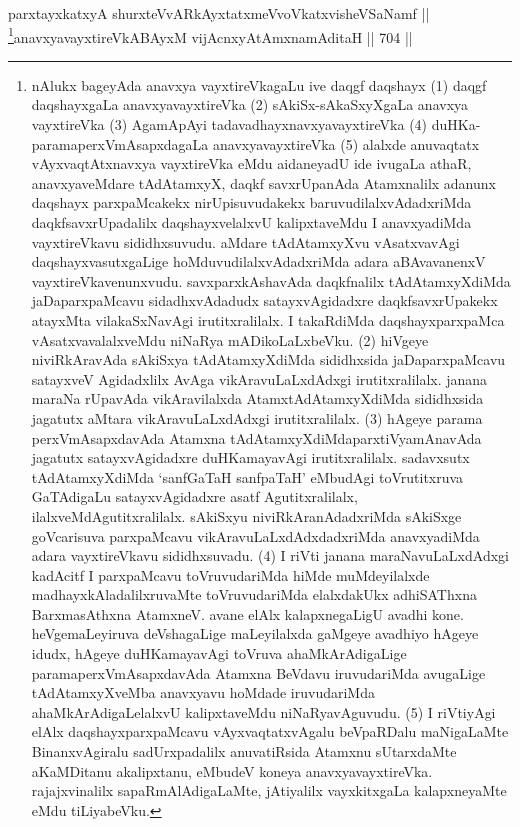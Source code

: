\begin{shl}
parxtayxkatxyA shurxteVvARkAyxtatxmeVvoVkatxvisheVSaNamf ||  \\
\footnote{nAlukx bageyAda anavxya vayxtireVkagaLu ive \ndash  daqgf daqshayx (1) daqgf daqshayxgaLa anavxyavayxtireVka (2)  sAkiSx-sAkaSxyXgaLa anavxya vayxtireVka (3) AgamApAyi tadavadhayxnavxyavayxtireVka (4) duHKa-paramaperxVmAsapxdagaLa anavxyavayxtireVka (5) alalxde anuvaqtatx vAyxvaqtAtxnavxya vayxtireVka eMdu aidaneyadU ide \ndash ivugaLa athaR, anavxyaveMdare tAdAtamxyX, daqkf savxrUpanAda Atamxnalilx adanunx daqshayx parxpaMcakekx nirUpisuvudakekx baruvudilalxvAdadxriMda daqkfsavxrUpadalilx daqshayxvelalxvU kalipxtaveMdu I anavxyadiMda vayxtireVkavu sididhxsuvudu. aMdare tAdAtamxyXvu vAsatxvavAgi daqshayxvasutxgaLige hoMduvudilalxvAdadxriMda adara aBAvavanenxV vayxtireVkavenunxvudu. savxparxkAshavAda daqkfnalilx tAdAtamxyXdiMda jaDaparxpaMcavu sidadhxvAdadudx satayxvAgidadxre daqkfsavxrUpakekx atayxMta vilakaSxNavAgi irutitxralilalx. I takaRdiMda daqshayxparxpaMca vAsatxvavalalxveMdu niNaRya mADikoLaLxbeVku. (2) hiVgeye niviRkAravAda sAkiSxya tAdAtamxyXdiMda sididhxsida jaDaparxpaMcavu satayxveV Agidadxlilx AvAga vikAravuLaLxdAdxgi irutitxralilalx. janana maraNa rUpavAda vikAravilalxda AtamxtAdAtamxyXdiMda sididhxsida jagatutx aMtara vikAravuLaLxdAdxgi irutitxralilalx. (3) hAgeye parama perxVmAsapxdavAda Atamxna tAdAtamxyXdiMda\break parxtiVyamAnavAda jagatutx satayxvAgidadxre duHKamayavAgi irutitxralilalx. sadavxsutx tAdAtamxyXdiMda `sanfGaTaH sanfpaTaH' eMbudAgi toVrutitxruva GaTAdigaLu satayxvAgidadxre asatf Agutitxralilalx, ilalxveMdAgutitxralilalx. sAkiSxyu niviRkAranAdadxriMda sAkiSxge goVcarisuva parxpaMcavu vikAravuLaLxdAdxdadxriMda anavxyadiMda adara vayxtireVkavu sididhxsuvadu. (4) I riVti janana maraNavuLaLxdAdxgi kadAcitf I parxpaMcavu toVruvudariMda hiMde muMdeyilalxde madhayxkAladalilxruvaMte toVruvudariMda elalxdakUkx adhiSAThxna BarxmasAthxna AtamxneV. avane elAlx kalapxnegaLigU avadhi kone. heVge\break maLeyiruva deVshagaLige maLeyilalxda gaMgeye avadhiyo hAgeye idudx, hAgeye duHKa\-\break mayavAgi toVruva ahaMkArAdigaLige paramaperxVmAsapxdavAda Atamxna BeVdavu iruvudariMda avugaLige tAdAtamxyXveMba anavxyavu hoMdade iruvudariMda ahaMkArAdigaLelalxvU kalipxtaveMdu niNaRyavAguvudu. (5) I riVtiyAgi elAlx daqshayxparxpaMcavu vAyxvaqtatxvAgalu beVpaRDalu maNigaLaMte BinanxvAgiralu sadUrxpadalilx anuvatiRsida Atamxnu sUtarxdaMte aKaMDitanu akalipxtanu, eMbudeV koneya anavxyavayxtireVka. rajajxvinalilx sapaRmAlAdigaLaMte, jAtiyalilx vayxkitxgaLa kalapxneyaMte eMdu tiLiyabeVku.}anavxyavayxtireVkABAyxM vijAcnxyA\s \s tAmxnamAditaH \hfill || 704 ||  
\end{shl}


